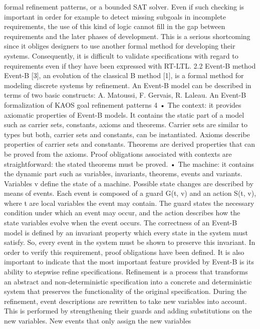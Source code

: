 formal refinement patterns, or a bounded SAT solver. Even if such checking is important
in order for example to detect missing subgoals in incomplete requirements, the use of this
kind of logic cannot fill in the gap between requirements and the later phases of development.
This is a serious shortcoming since it obliges designers to use another formal method for
developing their systems. Consequently, it is difficult to validate specifications with regard
to requirements even if they have been expressed with RT-LTL.
2.2 Event-B method
Event-B [3], an evolution of the classical B method [1], is a formal method for modeling
discrete systems by refinement. An Event-B model can be described in terms of two basic
constructs:
A. Matoussi, F. Gervais, R. Laleau. An Event-B formalization of KAOS goal refinement patterns 4
• The context: it provides axiomatic properties of Event-B models. It contains the
static part of a model such as carrier sets, constants, axioms and theorems. Carrier sets
are similar to types but both, carrier sets and constants, can be instantiated. Axioms
describe properties of carrier sets and constants. Theorems are derived properties
that can be proved from the axioms. Proof obligations associated with contexts are
straightforward: the stated theorems must be proved.
• The machine: it contains the dynamic part such as variables, invariants, theorems,
events and variants. Variables v define the state of a machine. Possible state changes
are described by means of events. Each event is composed of a guard G(t, v) and an
action S(t, v), where t are local variables the event may contain. The guard states the
necessary condition under which an event may occur, and the action describes how the
state variables evolve when the event occurs. The correctness of an Event-B model is
defined by an invariant property which every state in the system must satisfy. So, every
event in the system must be shown to preserve this invariant. In order to verify this
requirement, proof obligations have been defined.
It is also important to indicate that the most important feature provided by Event-B is its
ability to stepwise refine specifications. Refinement is a process that transforms an abstract
and non-deterministic specification into a concrete and deterministic system that preserves
the functionality of the original specification. During the refinement, event descriptions are
rewritten to take new variables into account. This is performed by strengthening their guards
and adding substitutions on the new variables. New events that only assign the new variables
